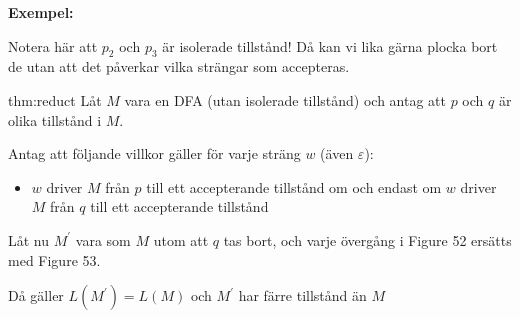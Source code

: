 \par\bigskip
\noindent\textbf{Exempel:}
\begin{figure}[ht!]
    \centering
    \caption{}
\end{figure}\par
\noindent Notera här att $p_2$ och $p_3$ är isolerade tillstånd! Då kan vi lika gärna plocka bort de utan att det påverkar vilka strängar som accepteras.
\newpage
\begin{theo}{thm:reduct}
  Låt $M$ vara en DFA (utan isolerade tillstånd) och antag att $p$ och $q$ är olika tillstånd i $M$.\par
  \noindent Antag att följande villkor gäller för varje sträng $w$ (även $\varepsilon$):
  \begin{itemize}
    \item $w$ driver $M$ från $p$ till ett accepterande tillstånd om och endast om $w$ driver $M$ från $q$ till ett accepterande tillstånd
  \end{itemize}\par
  \noindent Låt nu $M^{\prime}$ vara som $M$ utom att $q$ tas bort, och varje övergång i Figure 52 ersätts med Figure 53.\par
  \noindent Då gäller $L(M^{\prime}) = L(M)$ och $M^{\prime}$ har färre tillstånd än $M$
\end{theo}\par
\begin{figure}[ht!]
    \centering
    \caption{}
\end{figure}
